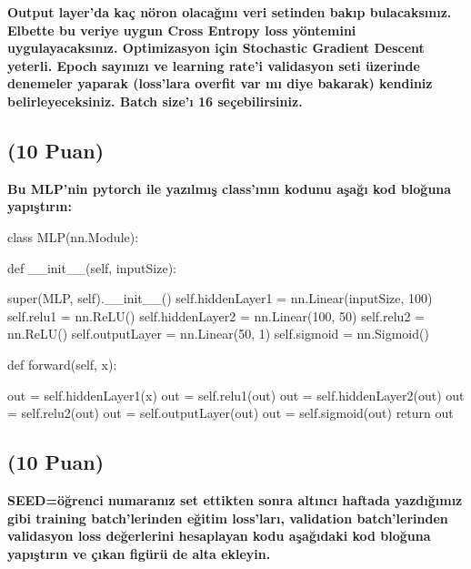 \documentclass[11pt]{article}
\begin{document}
\textbf{Output layer'da kaç nöron olacağını veri setinden bakıp bulacaksınız. Elbette bu veriye uygun Cross Entropy loss yöntemini uygulayacaksınız. Optimizasyon için Stochastic Gradient Descent yeterli. Epoch sayınızı ve learning rate'i validasyon seti üzerinde denemeler yaparak (loss'lara overfit var mı diye bakarak) kendiniz belirleyeceksiniz. Batch size'ı 16 seçebilirsiniz.}

\subsection{(10 Puan)} \textbf{Bu MLP'nin pytorch ile yazılmış class'ının kodunu aşağı kod bloğuna yapıştırın:}

\begin{python}
class MLP(nn.Module):

    def __init__(self, inputSize):

        super(MLP, self).__init__()
        self.hiddenLayer1 = nn.Linear(inputSize, 100)
        self.relu1 = nn.ReLU()
        self.hiddenLayer2 = nn.Linear(100, 50)
        self.relu2 = nn.ReLU()
        self.outputLayer = nn.Linear(50, 1)
        self.sigmoid = nn.Sigmoid()

    def forward(self, x):

        out = self.hiddenLayer1(x)
        out = self.relu1(out)
        out = self.hiddenLayer2(out)
        out = self.relu2(out)
        out = self.outputLayer(out)
        out = self.sigmoid(out)
        return out

\end{python}

\subsection{(10 Puan)} \textbf{SEED=öğrenci numaranız set ettikten sonra altıncı haftada yazdığımız gibi training batch'lerinden eğitim loss'ları, validation batch'lerinden validasyon loss değerlerini hesaplayan kodu aşağıdaki kod bloğuna yapıştırın ve çıkan figürü de alta ekleyin.}
\end{document}
